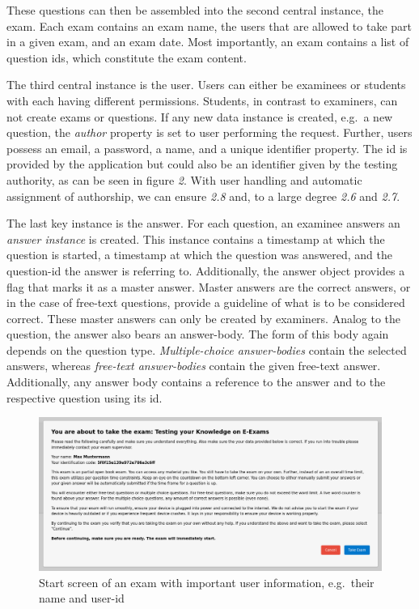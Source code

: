 These questions can then be assembled into the second central instance,
the exam. Each exam contains an exam name, the users that are allowed to
take part in a given exam, and an exam date. Most importantly, an exam
contains a list of question ids, which constitute the exam content.

The third central instance is the user. Users can either be examinees or
students with each having different permissions. Students, in contrast
to examiners, can not create exams or questions. If any new data
instance is created, e.g.~a new question, the \emph{author} property is
set to user performing the request. Further, users possess an email, a
password, a name, and a unique identifier property. The id is provided
by the application but could also be an identifier given by the testing
authority, as can be seen in figure \emph{2}. With user handling and
automatic assignment of authorship, we can ensure \emph{2.8} and, to a
large degree \emph{2.6} and \emph{2.7}.

The last key instance is the answer. For each question, an examinee
answers an \emph{answer instance} is created. This instance contains a
timestamp at which the question is started, a timestamp at which the
question was answered, and the question-id the answer is referring to.
Additionally, the answer object provides a flag that marks it as a
master answer. Master answers are the correct answers, or in the case of
free-text questions, provide a guideline of what is to be considered
correct. These master answers can only be created by examiners. Analog
to the question, the answer also bears an answer-body. The form of this
body again depends on the question type. \emph{Multiple-choice
answer-bodies} contain the selected answers, whereas \emph{free-text
answer-bodies} contain the given free-text answer. Additionally, any
answer body contains a reference to the answer and to the respective
question using its id.

\begin{figure}
\centering
\includegraphics{../figures/startExamCrop.png}
\caption{Start screen of an exam with important user information,
e.g.~their name and user-id}
\end{figure}

